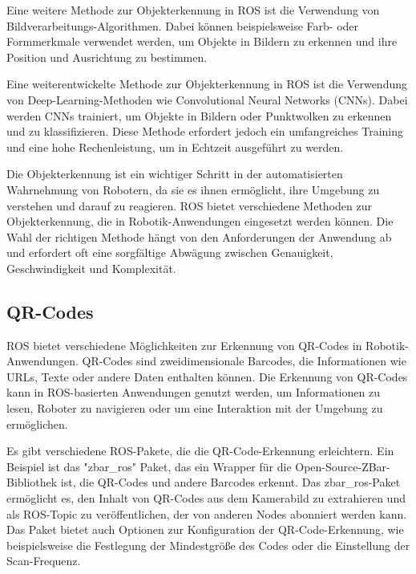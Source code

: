     Eine weitere Methode zur Objekterkennung in \ac{ROS} ist die Verwendung von Bildverarbeitungs-Algorithmen. Dabei können beispielsweise Farb- oder Formmerkmale verwendet werden, um Objekte in Bildern zu erkennen und ihre Position und Ausrichtung zu bestimmen.

    Eine weiterentwickelte Methode zur Objekterkennung in \ac{ROS} ist die Verwendung von Deep-Learning-Methoden wie Convolutional Neural Networks (CNNs). Dabei werden CNNs trainiert, um Objekte in Bildern oder Punktwolken zu erkennen und zu klassifizieren. Diese Methode erfordert jedoch ein umfangreiches Training und eine hohe Rechenleistung, um in Echtzeit ausgeführt zu werden.

    Die Objekterkennung ist ein wichtiger Schritt in der automatisierten Wahrnehmung von Robotern, da sie es ihnen ermöglicht, ihre Umgebung zu verstehen und darauf zu reagieren. \ac{ROS} bietet verschiedene Methoden zur Objekterkennung, die in Robotik-Anwendungen eingesetzt werden können. Die Wahl der richtigen Methode hängt von den Anforderungen der Anwendung ab und erfordert oft eine sorgfältige Abwägung zwischen Genauigkeit, Geschwindigkeit und Komplexität.


    \subsection{QR-Codes} \label{qr-codes:subsection}
    \ac{ROS} bietet verschiedene Möglichkeiten zur Erkennung von QR-Codes in Robotik-Anwendungen. QR-Codes sind zweidimensionale Barcodes, die Informationen wie URLs, Texte oder andere Daten enthalten können. Die Erkennung von QR-Codes kann in \ac{ROS}-basierten Anwendungen genutzt werden, um Informationen zu lesen, Roboter zu navigieren oder um eine Interaktion mit der Umgebung zu ermöglichen.

    Es gibt verschiedene \ac{ROS}-Pakete, die die QR-Code-Erkennung erleichtern. Ein Beispiel ist das "zbar\_ros" Paket, das ein Wrapper für die Open-Source-ZBar-Bibliothek ist, die QR-Codes und andere Barcodes erkennt. Das zbar\_ros-Paket ermöglicht es, den Inhalt von QR-Codes aus dem Kamerabild zu extrahieren und als \ac{ROS}-Topic zu veröffentlichen, der von anderen Nodes abonniert werden kann. Das Paket bietet auch Optionen zur Konfiguration der QR-Code-Erkennung, wie beispielsweise die Festlegung der Mindestgröße des Codes oder die Einstellung der Scan-Frequenz.

